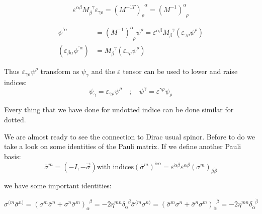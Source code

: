 \begin{equation}
 \varepsilon^{ \alpha \beta} M^{\;\;\gamma}_{\beta} \varepsilon_{\gamma \rho} = (M^{-1T})^{\;\;\alpha}_{\rho} = (M^{-1})^{\alpha}_{\;\;\rho} 
\end{equation}


\begin{align}
\psi^{'\alpha} &= (M^{-1})^{\alpha}_{\;\;\rho} \psi^{\rho}  = \varepsilon^{ \alpha \beta} M^{\;\;\gamma}_{\beta} (\varepsilon_{\gamma \rho}\psi^{\rho} )
\\  
(\varepsilon_{ \beta \alpha}\psi^{'\alpha} ) &=   M^{\;\;\gamma}_{\beta} (\varepsilon_{\gamma \rho}\psi^{\rho} )
\end{align}

Thus $\varepsilon_{\gamma \rho}\psi^{\rho}$ transform as $\psi_{\gamma}$ and the $\varepsilon$ tensor can be used to lower and raise indices:
\begin{equation}
\psi_{\gamma}  = \varepsilon_{\gamma \rho}\psi^{\rho} \quad ; \quad \psi^{\gamma}  = \varepsilon^{\gamma \rho}\psi_{\rho}
\end{equation}


Every thing that we have done for undotted indice can be done similar for dotted.

We are almost ready to see the connection to Dirac usual spinor. Before to do we take a look on some identities of the Pauli matrix. If we define another Pauli basis:
\begin{subequations}
\begin{equation}
\bar{\sigma} ^{m} = (-I,-\vec{\sigma})
\end{equation}
 \text{with indices}
\begin{equation}
 (\bar{\sigma} ^{m})^{\dot{\alpha} \alpha} = \varepsilon^{\dot{\alpha}\dot{\beta}}\varepsilon^{\alpha\beta} (\sigma^{m})_{\beta \dot{\beta}}
\end{equation}
\end{subequations}

we have some important identities:

\begin{subequations}
\begin{equation}
 \sigma^{(m}\bar{\sigma}^{n)} = (\sigma^{m}\bar{\sigma}^{n} + \sigma^{n}\bar{\sigma}^{m})^{\;\;\beta}_{\alpha} = -2\eta^{mn}\delta^{\;\;\beta}_{\alpha}
\end{equation}
\begin{equation}
 \bar{\sigma}^{(m}\sigma^{n)} = (\bar{\sigma}^{m}\sigma^{n} + \bar{\sigma}^{n}\sigma^{m})^{\;\;\dot{\beta}}_{\dot{\alpha}} = -2\eta^{mn}\delta^{\;\;\dot{\beta}}_{\dot{\alpha}}
\end{equation}
\end{subequations}

